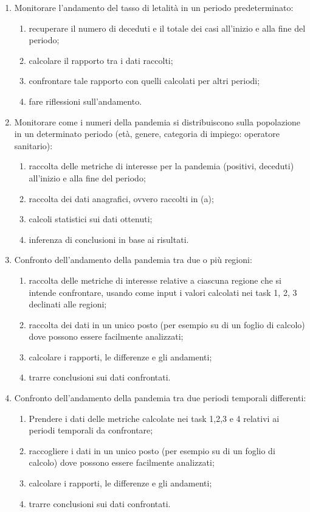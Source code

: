 \begin{enumerate}[resume]
    \item Monitorare l'andamento del tasso di letalità in un periodo predeterminato:
    \begin{enumerate}[label=\alph*.]
        \item recuperare il numero di deceduti e il totale dei casi all'inizio e alla fine del periodo;
        \item calcolare il rapporto tra i dati raccolti;
        \item confrontare tale rapporto con quelli calcolati per altri periodi;
        \item fare riflessioni sull'andamento.
    \end{enumerate}
    \item Monitorare come i numeri della pandemia si distribuiscono sulla popolazione in un determinato periodo (età, genere, categoria di impiego: operatore sanitario):
    \begin{enumerate}[label=\alph*.]
        \item raccolta delle metriche di interesse per la pandemia (positivi, deceduti) all'inizio e alla fine del periodo;
        \item raccolta dei dati anagrafici, ovvero raccolti in (a);
        \item calcoli statistici sui dati ottenuti;
        \item inferenza di conclusioni in base ai risultati.
    \end{enumerate}
    \item Confronto dell'andamento della pandemia tra due o più regioni:
    \begin{enumerate}[label=\alph*.]
        \item raccolta delle metriche di interesse relative a ciascuna regione che si intende confrontare, usando come input i valori calcolati nei task 1, 2, 3 declinati alle regioni;
        \item raccolta dei dati in un unico posto (per esempio su di un foglio di calcolo) dove possono essere facilmente analizzati;
        \item calcolare i rapporti, le differenze e gli andamenti;
        \item trarre conclusioni sui dati confrontati.
    \end{enumerate}
    \item Confronto dell'andamento della pandemia tra due periodi temporali differenti:
    \begin{enumerate}[label=\alph*.]
        \item Prendere i dati delle metriche calcolate nei task 1,2,3 e 4 relativi ai periodi temporali da confrontare;
        \item raccogliere i dati in un unico posto (per esempio su di un foglio di calcolo) dove possono essere facilmente analizzati;
        \item calcolare i rapporti, le differenze e gli andamenti;
        \item trarre conclusioni sui dati confrontati.
    \end{enumerate}
\end{enumerate}